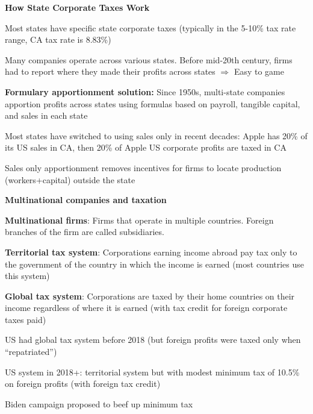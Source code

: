 \documentclass[landscape]{slides}
\begin{document}
\begin{slide}
\begin{center}
{\bf How State Corporate Taxes Work}
\end{center}
Most states have specific state corporate taxes (typically in the 5-10\% tax rate range, CA tax rate is 8.83\%)

Many companies operate across various states. Before mid-20th century, firms had to report where they made
their profits across states $\Rightarrow$ Easy to game 

\textbf{Formulary apportionment solution:} Since 1950s, multi-state companies apportion profits across states using formulas based
on payroll, tangible capital, and sales in each state

Most states have switched to using sales only in recent decades: Apple has 20\% of its US sales in CA,
then 20\% of Apple US corporate profits are taxed in CA

Sales only apportionment removes incentives for firms to locate production (workers+capital) outside the
state

\end{slide}




\begin{slide}
\begin{center}
{\bf Multinational companies and taxation}
\end{center}


{\bf Multinational firms}: Firms that operate in multiple countries. Foreign branches of the firm
are called subsidiaries.


{\bf Territorial tax system}: Corporations earning income abroad pay tax only to the government of the country in which the income is earned (most countries use this system)

{\bf Global tax system}: Corporations are taxed by their home countries on their income regardless of where it is earned (with tax credit for foreign corporate taxes paid)

\small 
US had global tax system before 2018 (but foreign profits were taxed only when ``repatriated'')

US system in 2018+: territorial system but with modest minimum tax of 10.5\% on foreign profits (with foreign tax credit)

Biden campaign proposed to beef up minimum tax

%

\end{slide}
\end{document}
